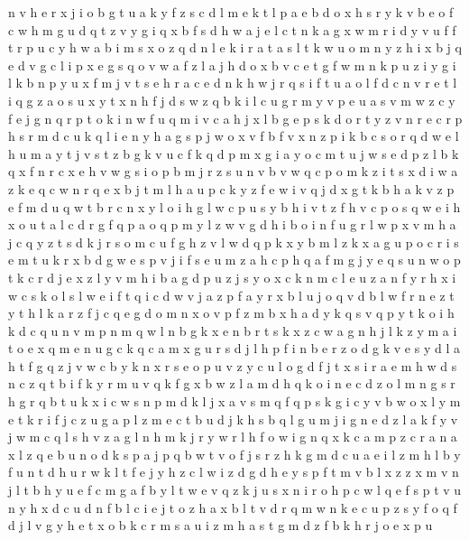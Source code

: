 \documentclass{article}
\begin{document}
n v h e r x j i o b g t u a k y f z s c d l
m e k t l p
a e b d o x h s
r y k v b e o f c w h m g u d q
t z v y g i q x b f s d h w a j e l
c t n k a g x w m r i d y v u f
f t r p u c y h w a b i m s x o z q d n l e k
i r a t
a s l t k w u o m n y z h i x b j q e d v g c
l i p x
e g s q o v w a f z
l a j h d o x b v c e t g f w m n k p u z i y
g i l k b n p y u x f m j v t s e h r a c
e d n k h w j r q s i f t u a o l
f d c n v r e t l i q g z a o s u x y
t x n h f j d s w z q b k i l c u g r m y v p e
u a s v m w z c y f e j g n q r p t o k i
n w f u q m i v c a h j x l b g e p s k d o r t y z
v n r e c
r p h s
r m d c u k q l i e n y h a g s p j w o x v f b
f v x n z p i k b c s o r q d w e l h u m a y t j
v s t z b g k
v u c f k q d p m x
g i a y o c m t u j w s e d p z l b k q x f n r
c x e h v w g s i o p b m j r z
s u n v b
v w q c p o m k z i t s x d
i w a z k e q c
w n r q e x b j t m l h a u p c k y
z f e w i v q j d x g t k b h
a k v z p e f m d u q w t b r c n x y l o i h g
l w c p u s y b h i v t
z f h v c p o s q w
e i h x o u t a l c d r g f q p
a o q p m y l z w v g d h i
b o i n f u g r l w p x v m h a j c q y z t s d k
j r s o m c u f g h z v l w d q p k x y
b m l z k x a g u p o c r i s e
m t u k r x b d g w e s p v j i f
s e u m z
a h c
p h q a f m g
j y e q
s u n w o p t k c r d j e x z l y v m h i b a
g d p u z j s y o x c
k n m c l e u z a
n f y r h x i w c s k o l
s l w e i f t q
i c d w v j a
z p f a y r x b l
u j o q v d b l w f r n e z t
y t h l k a r z f j c q e g d o m n x
o v p f z m b x h a d y k q
s v q p y t k o i
h k d c q u n v m
p n m
q
w
l n b g k x e
n b r t s k x z c w a
g n h j l k z y m a i t o e x
q m e n u g c
k q c a m x g u r s d j l h p f i n b e
r z o d g k v e s y
d l a h t f g q z j v w c b y k n x r s e o p u
v z y c u l o g d f j t x s i r a e m h
w d s n c z q t b i f k y r m u
v q k
f g x b w z l a m d h q k o i n e
c
d z o l m n g s r
h
g r q b t u k x i c w s n p m d
k l j x a v s m q
f q p s k g i c y
v b w o x l y m e t k r i f j c z u g a p
l z m e c t b u d j k h
s b q l g u m j
i g n e d z l a k f y v j w m c
q l s h
v z a g l n h m k j r y w
r l h f o w i g n q x k c a m p z
c r a n
a
x l z q e b u n o d k s p a j
p q b w t v o f j s r z h k g m d c u a e i l
z m h l b y f u n
t d h
u r w k l t f e j y h z c
l w i z d g
d h e y s p f t m v b l x z
z x m v n j l t b h y u e f c
m g a f b y l t w e v q z k j u s x n i r o h p c
w l q e f s p t v u n y h x d c
u d n f b l c i e j t o z
h a x b l t v d r q m w n k e c u p z s y f
o
q f d j l v g y h e t x o b k c r m s a u i z
m h
a s t g m d z f b k h r j o e x p u
\end{document}
